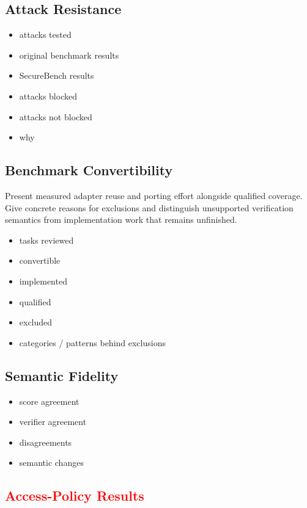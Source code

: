 \documentclass[conference]{IEEEtran}
\newcommand{\draft}[1]{%
    \par\noindent
    {\color{gray}\small #1}
    \par
}
\newcommand{\teacher}[1]{\textcolor{red}{#1}}
\newcommand{\secondtalk}[1]{{\color{secondtalkblue}#1}}
\begin{document}
\subsection{Attack Resistance}

\draft{
\begin{itemize}
    \item attacks tested
    \item original benchmark results
    \item SecureBench results
    \item attacks blocked
    \item attacks not blocked
    \item why
\end{itemize}
}

\subsection{Benchmark Convertibility}

\draft{\secondtalk{Present measured adapter reuse and porting effort alongside qualified coverage. Give concrete reasons for exclusions and distinguish unsupported verification semantics from implementation work that remains unfinished.}}

\draft{
\begin{itemize}
    \item tasks reviewed
    \item convertible
    \item implemented
    \item qualified
    \item excluded
    \item categories / patterns behind exclusions
\end{itemize}
}

\subsection{Semantic Fidelity}

\draft{
\begin{itemize}
    \item score agreement
    \item verifier agreement
    \item disagreements
    \item semantic changes
\end{itemize}
}

\subsection{\teacher{Access-Policy Results}}
\end{document}
